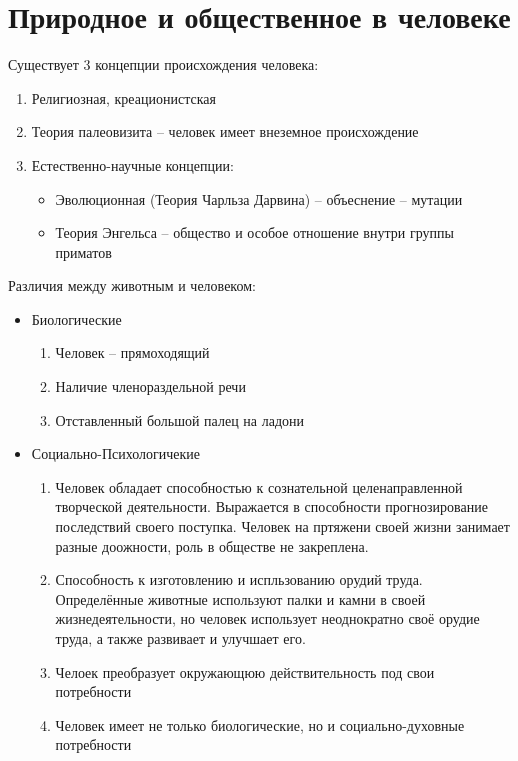 \documentclass[12pt,a4paper]{book}
\begin{document}
 \section{Природное и общественное в человеке}
 Существует 3 концепции происхождения человека:
 \begin{enumerate}
 	\item Религиозная, креационистская 
 	\item Теория палеовизита -- человек имеет внеземное происхождение
 	\item Естественно-научные концепции:
 	\begin{itemize}
 		\item Эволюционная (Теория Чарльза Дарвина) -- объеснение -- мутации
 		\item Теория Энгельса -- общество и особое отношение внутри группы приматов 
 	\end{itemize}
 \end{enumerate}
 
 Различия между животным и человеком:
 \begin{itemize}
 	\item Биологические 
 	\begin{enumerate}
 		\item Человек -- прямоходящий
 		\item Наличие членораздельной речи
 		\item Отставленный большой палец на ладони
 	\end{enumerate}
 	\item Социально-Психологичекие
 	\begin{enumerate}
 		\item Человек обладает способностью к сознательной целенаправленной творческой деятельности. Выражается в способности прогнозирование последствий своего поступка. Человек на пртяжени своей жизни занимает разные доожности, роль в обществе не закреплена.
 		\item Способность к изготовлению и испльзованию орудий труда. Определённые животные используют палки и камни в своей жизнедеятельности, но человек использует неоднократно своё орудие труда, а также развивает и улучшает его.
 		\item Челоек преобразует окружающюю действительность под свои 
потребности
		\item Человек имеет не только биологические, но и социально-духовные потребности
 	\end{enumerate}
 \end{itemize}
\end{document}
